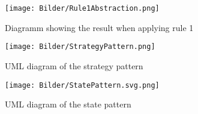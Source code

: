 
\begin{figure}
\centering
\texttt{[image: Bilder/Rule1Abstraction.png]}
\caption[Diagramm showing the result when applying rule 1]{Diagramm showing the result when applying rule 1}
\label{picture:rule1abstraction}
\end{figure}


\begin{figure}
\centering
\texttt{[image: Bilder/StrategyPattern.png]}
\caption[\acf{UML} diagram of the strategy pattern]{\acf{UML} diagram of the strategy pattern}
\label{picture:strategypattern}
\end{figure}

\begin{figure}
\centering
\texttt{[image: Bilder/StatePattern.svg.png]}
\caption[\acf{UML} diagram of the state pattern]{\acf{UML} diagram of the state pattern}
\label{picture:statepattern}
\end{figure}